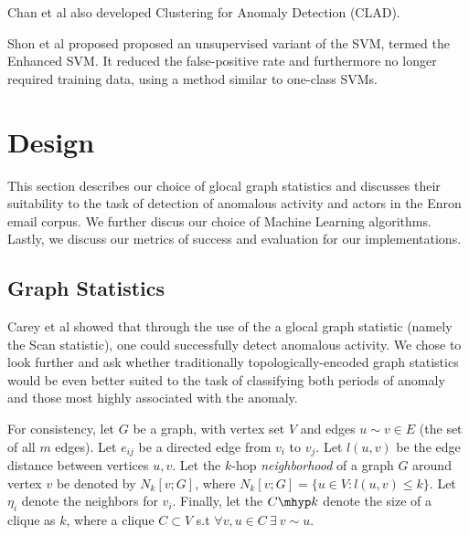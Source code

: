 \documentclass[11pt,letterpaper]{article}
\begin{document}
Chan et al \cite{chan2003machine} also developed Clustering for Anomaly Detection (CLAD).

Shon et al proposed \cite{shon2007hybrid} proposed an unsupervised variant of the SVM, termed
the Enhanced SVM. It reduced the false-positive rate and furthermore no longer required 
training data, using a method similar to one-class SVMs.





\section{Design}
This section describes our choice of glocal graph statistics and discusses their suitability
to the task of detection of anomalous activity and actors in the Enron email corpus.
We further discus our choice of Machine Learning algorithms. Lastly, we discuss our metrics
of success and evaluation for our implementations.

\subsection{Graph Statistics}
Carey et al \cite{priebe2005scan} showed that through the use of the a glocal graph 
statistic (namely the Scan statistic), one could successfully detect anomalous activity.
We chose to look further and ask whether traditionally topologically-encoded graph statistics would
be even better suited to the task of classifying both periods of anomaly and those
most highly associated with the anomaly.

For consistency, let $G$ be a graph, with vertex set $V$ and edges $u \sim v \in E$ (the set of
all $m$ edges). Let $e_{ij}$ be a directed edge from $v_i$ to $v_j$. Let $l(u,v)$ be the edge
distance between vertices $u, v$. Let the $k$-hop \emph{neighborhood} of a graph $G$ around
vertex $v$ be denoted by $N_k[v;G]$, where $N_k[v;G] = \{u \in V:l(u,v) \le k\}$. Let $\eta_i$ 
denote the neighbors for $v_i$. Finally, let the $C\mhyp k$ denote the size of a clique as $k$, where a clique $C \subset V$ s.t $\forall v,u \in C\ \exists\ v \sim u$.
\end{document}
